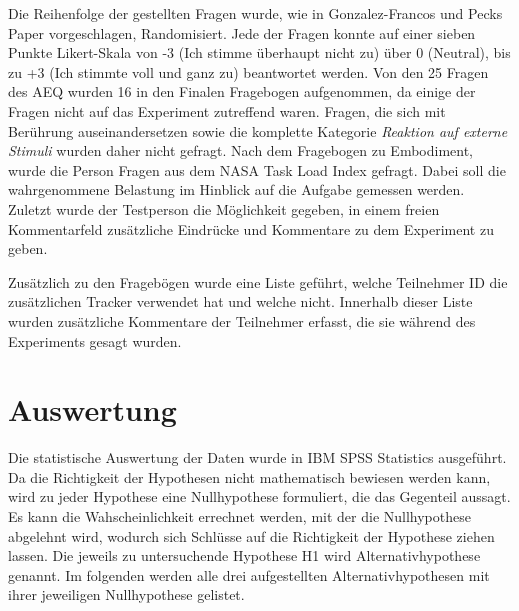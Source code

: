 Die Reihenfolge der gestellten Fragen wurde, wie in Gonzalez-Francos und Pecks Paper vorgeschlagen, Randomisiert. Jede der Fragen konnte auf einer sieben Punkte Likert-Skala von -3 (Ich stimme überhaupt nicht zu) über 0 (Neutral), bis zu +3 (Ich stimmte voll und ganz zu) beantwortet werden.
Von den 25 Fragen des AEQ wurden 16 in den Finalen Fragebogen aufgenommen, da einige der Fragen nicht auf das Experiment zutreffend waren. Fragen, die sich mit Berührung auseinandersetzen sowie die komplette Kategorie \textit{Reaktion auf externe Stimuli} wurden daher nicht gefragt.
Nach dem Fragebogen zu Embodiment, wurde die Person Fragen aus dem NASA Task Load Index \cite{HART1988} gefragt. Dabei soll die wahrgenommene Belastung im Hinblick auf die Aufgabe gemessen werden.
Zuletzt wurde der Testperson die Möglichkeit gegeben, in einem freien Kommentarfeld zusätzliche Eindrücke und Kommentare zu dem Experiment zu geben.

Zusätzlich zu den Fragebögen wurde eine Liste geführt, welche Teilnehmer ID die zusätzlichen Tracker verwendet hat und welche nicht. Innerhalb dieser Liste wurden zusätzliche Kommentare der Teilnehmer erfasst, die sie während des Experiments gesagt wurden.


\section{Auswertung}
Die statistische Auswertung der Daten wurde in IBM SPSS Statistics ausgeführt. 
Da die Richtigkeit der Hypothesen nicht mathematisch bewiesen werden kann, wird zu jeder Hypothese eine Nullhypothese formuliert, die das Gegenteil aussagt. Es kann die Wahscheinlichkeit errechnet werden, mit der die Nullhypothese abgelehnt wird, wodurch sich Schlüsse auf die Richtigkeit der Hypothese ziehen lassen. Die jeweils zu untersuchende Hypothese H1 wird Alternativhypothese genannt. Im folgenden werden alle drei aufgestellten Alternativhypothesen mit ihrer jeweiligen Nullhypothese gelistet.

